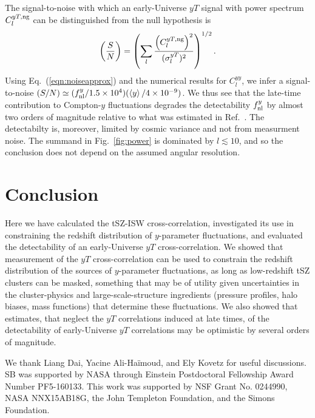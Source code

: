 \documentclass[aps,twocolumn,floats,prd,nofootinbib,10pt,floatfix]{revtex4-1}
\def\VEV#1{\left\langle #1 \right\rangle}
\begin{document}
The signal-to-noise with which an early-Universe
$yT$ signal with power spectrum $C_l^{yT,{\rm ng}}$ can be
distinguished from the null hypothesis is
\begin{equation}
     \left(\frac{S}{N} \right) = \left(\sum_l\frac{\left(C_l^{yT,{\rm ng}}
     \right)^2}{(\sigma_l^{yT})^2}\right)^{1/2}.
\label{eqn:SN}
\end{equation}
Using Eq.~(\ref{eqn:noiseapprox}) and the numerical results for
$C_l^{yy}$, we infer a signal-to-noise $(S/N) \simeq  (f_{\rm
nl}^y/1.5\times 10^4) (\VEV{y}/4\times 10^{-9})$.  We thus see
that the late-time contribution to Compton-$y$ fluctuations
degrades the detectability $f_{\rm nl}^y$ by almost two orders
of magnitude relative to what was estimated in
Ref.~\cite{Emami:2015xqa}.  The detectabilty is, moreover,
limited by cosmic variance and not from measurment noise.
The summand in Fig.~\ref{fig:power} is dominated by $l\lesssim
10$, and so the conclusion does not depend on the assumed
angular resolution.

\section{Conclusion}
\label{sec:concl}

Here we have calculated the tSZ-ISW cross-correlation,
investigated its use in constraining the redshift distribution
of $y$-parameter fluctuations, and evaluated the detectability
of an early-Universe $yT$ cross-correlation.  We showed that
measurement of the $yT$ cross-correlation can be used to
constrain the redshift distribution of the sources of
$y$-parameter fluctuations, as long as low-redshift tSZ clusters
can be masked, something that may be of utility
given uncertainties in the cluster-physics and
large-scale-structure ingredients (pressure profiles, halo
biases, mass functions) that determine these fluctuations.  We
also showed that estimates, that neglect the $yT$
correlations induced at late times, of the detectability of
early-Universe $yT$ correlations may be optimistic by several
orders of magnitude.

\begin{acknowledgments}
We thank Liang Dai, Yacine Ali-Ha\"{i}moud, and Ely
Kovetz for useful discussions.  SB was supported by NASA through
Einstein Postdoctoral Fellowship Award Number PF5-160133.  This
work was supported by NSF Grant No. 0244990, NASA NNX15AB18G,
the John Templeton Foundation, and the Simons Foundation.
\end{acknowledgments}
\end{document}
